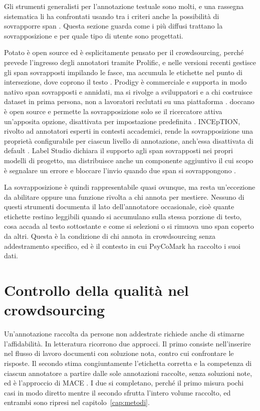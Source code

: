 \documentclass[]{sapthesis}
\begin{document}
Gli strumenti generalisti per l'annotazione testuale sono molti, e una rassegna sistematica li ha confrontati usando tra i criteri anche la possibilità di sovrapporre span \parencite{neves2021review}. Questa sezione guarda come i più diffusi trattano la sovrapposizione e per quale tipo di utente sono progettati.

Potato è open source ed è esplicitamente pensato per il crowdsourcing, perché prevede l'ingresso degli annotatori tramite Prolific, e nelle versioni recenti gestisce gli span sovrapposti impilando le fasce, ma accumula le etichette nel punto di intersezione, dove coprono il testo \parencite{pei2022potato}. Prodigy è commerciale e supporta in modo nativo span sovrapposti e annidati, ma si rivolge a sviluppatori e a chi costruisce dataset in prima persona, non a lavoratori reclutati su una piattaforma \parencite{prodigy}. doccano è open source e permette la sovrapposizione solo se il ricercatore attiva un'apposita opzione, disattivata per impostazione predefinita \parencite{doccano}. INCEpTION, rivolto ad annotatori esperti in contesti accademici, rende la sovrapposizione una proprietà configurabile per ciascun livello di annotazione, anch'essa disattivata di default \parencite{klie2018inception}. Label Studio dichiara il supporto agli span sovrapposti nei propri modelli di progetto, ma distribuisce anche un componente aggiuntivo il cui scopo è segnalare un errore e bloccare l'invio quando due span si sovrappongono \parencite{labelstudio}.

La sovrapposizione è quindi rappresentabile quasi ovunque, ma resta un'eccezione da abilitare oppure una funzione rivolta a chi annota per mestiere. Nessuno di questi strumenti documenta il lato dell'annotatore occasionale, cioè quante etichette restino leggibili quando si accumulano sulla stessa porzione di testo, cosa accada al testo sottostante e come si selezioni o si rimuova uno span coperto da altri. Questa è la condizione di chi annota in crowdsourcing senza addestramento specifico, ed è il contesto in cui PsyCoMark ha raccolto i suoi dati.

\section{Controllo della qualità nel crowdsourcing}
\label{sec:crowdquality}

Un'annotazione raccolta da persone non addestrate richiede anche di stimarne l'affidabilità. In letteratura ricorrono due approcci. Il primo consiste nell'inserire nel flusso di lavoro documenti con soluzione nota, contro cui confrontare le risposte. Il secondo stima congiuntamente l'etichetta corretta e la competenza di ciascun annotatore a partire dalle sole annotazioni raccolte, senza soluzioni note, ed è l'approccio di MACE \parencite{hovy2013mace}. I due si completano, perché il primo misura pochi casi in modo diretto mentre il secondo sfrutta l'intero volume raccolto, ed entrambi sono ripresi nel capitolo~\ref{cap:metodi}.
\end{document}
